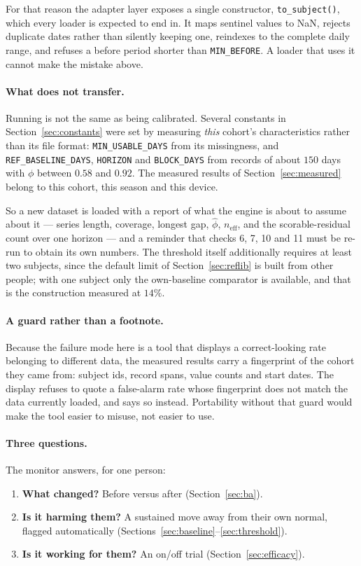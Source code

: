 \documentclass{article}
\theoremstyle{plain}
\theoremstyle{definition}
\theoremstyle{remark}
\numberwithin{equation}{section}
\begin{document}
For that reason the adapter layer exposes a single constructor,
\texttt{to\_subject()}, which every loader is expected to end in. It maps
sentinel values to NaN, rejects duplicate dates rather than silently keeping
one, reindexes to the complete daily range, and refuses a before period shorter
than \texttt{MIN\_BEFORE}. A loader that uses it cannot make the mistake above.

\paragraph{What does not transfer.} Running is not the same as being
calibrated. Several constants in Section~\ref{sec:constants} were set by
measuring \emph{this} cohort's characteristics rather than its file format:
\texttt{MIN\_USABLE\_DAYS} from its missingness, and
\texttt{REF\_BASELINE\_DAYS}, \texttt{HORIZON} and \texttt{BLOCK\_DAYS} from
records of about $150$ days with $\phi$ between $0.58$ and $0.92$. The measured
results of Section~\ref{sec:measured} belong to this cohort, this season and
this device.

So a new dataset is loaded with a report of what the engine is about to assume
about it --- series length, coverage, longest gap, $\hat\phi$, $n_{\mathrm{eff}}$,
and the scorable-residual count over one horizon --- and a reminder that checks
6, 7, 10 and 11 must be re-run to obtain its own numbers. The threshold itself
additionally requires at least two subjects, since the default limit of
Section~\ref{sec:reflib} is built from other people; with one subject only the
own-baseline comparator is available, and that is the construction measured at
$14\%$.

\paragraph{A guard rather than a footnote.} Because the failure mode here is a
tool that displays a correct-looking rate belonging to different data, the
measured results carry a fingerprint of the cohort they came from: subject ids,
record spans, value counts and start dates. The display refuses to quote a
false-alarm rate whose fingerprint does not match the data currently loaded, and
says so instead. Portability without that guard would make the tool easier to
misuse, not easier to use.

\paragraph{Three questions.} The monitor answers, for one person:
\begin{enumerate}[nosep]
  \item \textbf{What changed?} Before versus after (Section~\ref{sec:ba}).
  \item \textbf{Is it harming them?} A sustained move away from their own
    normal, flagged automatically (Sections~\ref{sec:baseline}--\ref{sec:threshold}).
  \item \textbf{Is it working for them?} An on/off trial
    (Section~\ref{sec:efficacy}).
\end{enumerate}
\end{document}

